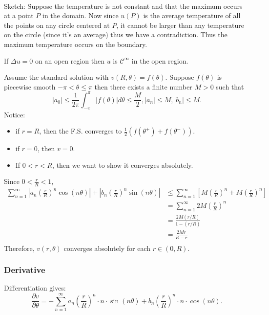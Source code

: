 \documentclass[class=article,crop=false]{standalone}
\begin{document}
~\begin{prf}
Sketch:	Suppose the temperature is not constant and that the maximum occurs at a point $ P$ in the domain. Now since  $ u(P)$ is the average temperature of all the points on any circle centered at  $ P$, it cannot be larger than any temperature on the circle (since it's an average) thus we have a contradiction. Thus the maximum temperature occurs on the boundary.
\end{prf}

\begin{claim}[]
	If $ \Delta u=0$ on an open region then $ u$ is  $ \mathcal{ C}^{\infty}$ in the open region.
\end{claim}
\begin{prf}
	Assume the standard solution with $ v(R,\theta)=f(\theta)$. Suppose $ f(\theta)$ is piecewise smooth $ -\pi<\theta\leq \pi$ then there exists a finite number $ M>0$  such that 
	\[
		|a_0|\leq \frac{1}{2\pi} \int_{-\pi}^{\pi} |f(\theta)| d\theta   \leq \frac{M}{2}, |a_n|\leq M, |b_n|\leq M
	.\] 
Notice:
\begin{itemize}
	\item if $ r=R$, then the F.S. converges to  $ \frac{1}{2} (f(\theta^{+})+f(\theta^{-}))$.
	\item if $ r=0$, then  $ v=0$.
	\item If  $ 0<r<R$, then we want to show it converges absolutely.
\end{itemize}

Since $ 0< \frac{r}{R}<1$,
\begin{align*}
	\sum_{ n= 1}^{\infty} \left| a_n\left( \frac{r}{R} \right)^{n} \cos(n\theta )  \right| + \left| b_n \left( \frac{r}{R} \right)^{n} \sin(n\theta ) \right| &\leq \sum_{ n= 1}^{\infty} \left[ M\left( \frac{r}{R} \right)^{n} + M \left( \frac{r}{R} \right)^{n}  \right] \\
																				  &= \sum_{ n= 1}^{\infty} 2M\left( \frac{r}{R} \right)^{n}  \\
																				  &= \frac{2M (r /R)}{1-(r /R) } \\
																				  &= \frac{2Mr}{R-r } \\
\end{align*}
Therefore, $ v(r,\theta)$ converges absolutely for each $ r \in (0,R)$.
\end{prf}

\subsubsection{Derivative}
Differentiation gives:
\[
	\frac{\partial v}{\partial \theta} = -\sum_{ n= 1}^{\infty} a_n \left( \frac{r}{R} \right)^{n} \cdot n \cdot \sin(n\theta ) + b_n\left( \frac{r}{R} \right)^{n} \cdot n \cdot \cos(n \theta )
.\] 
\end{document}
